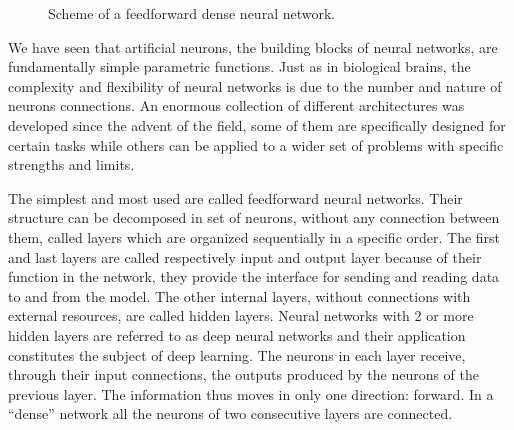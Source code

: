 \documentclass[a4paper,10pt]{report}
\begin{document}
\begin{figure}
\begin{center}
    \end{center}
    \caption{Scheme of a feedforward dense neural network.}
\end{figure}

We have seen that artificial neurons, the building blocks of neural networks,
are fundamentally simple parametric functions.
Just as in biological brains, the complexity and flexibility
of neural networks is due to the number and nature of neurons connections.
An enormous collection of different architectures was developed since the advent of the field,
some of them are specifically designed for certain tasks while others can be applied
to a wider set of problems with specific strengths and limits.

The simplest and most used are called feedforward neural networks.
Their structure can be decomposed in set of neurons, without any connection between them, called layers which are
organized sequentially in a specific order.
The first and last layers are called respectively input and output layer because of
their function in the network, they provide the interface for sending and reading data to and from 
the model. The other internal layers, without connections with external resources, are called hidden layers.
Neural networks with 2 or more hidden layers are referred to as deep neural networks and their
application constitutes the subject of deep learning.
The neurons in each layer receive, through their input connections,
the outputs produced by the neurons of the previous layer.  The information thus moves in
only one direction: forward. In a ``dense'' network all the neurons of two consecutive layers
are connected.
\end{document}
